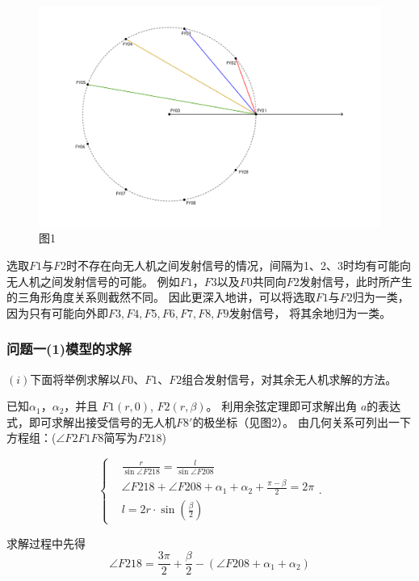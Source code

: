 \documentclass{ctexart}
\def\al{\alpha}
\def\b{\beta}
\begin{document}
	\begin{figure}[htbp]  %
		\centering
		\includegraphics[scale=0.6]{pic/1.png}
		\caption*{图1}
		\label{fig1}
	\end{figure}

	\par
	选取$F1$与$F2$时不存在向无人机之间发射信号的情况，间隔为1、2、3时均有可能向无人机之间发射信号的可能。
	例如$F1$，$F3$以及$F0$共同向$F2$发射信号，此时所产生的三角形角度关系则截然不同。
	因此更深入地讲，可以将选取$F1$与$F2$归为一类，因为只有可能向外即$F3,F4,F5,F6,F7,F8,F9$发射信号，
	将其余地归为一类。
	
	\subsubsection{问题一(1)模型的求解}
	\noindent $(i)$下面将举例求解以$F0$、$F1$、$F2$组合发射信号，对其余无人机求解的方法。
	\par
	已知$\alpha_1$，$\alpha_2$，并且 $F1(r,0)$, $F2(r,\beta)$。
	利用余弦定理即可求解出角 $a$的表达式，即可求解出接受信号的无人机$F8'$的极坐标（见图2）。
	由几何关系可列出一下方程组：($\angle F2F1F8$简写为$F218$)

	\[\left\{
    \begin{aligned}
    &\frac{r}{\sin \angle F2 1 8}=\frac{l}{\sin \angle F208}\\
    &\angle F218+\angle F208 +\al_1 +\al_2 +\frac{\pi -\b}{2} = 2\pi\\
	&l=2r\cdot \sin(\frac{\b}{2})
    \end{aligned}.
    \right.
	\]

	求解过程中先得
	\begin{equation*}
		\angle F218= \frac{3\pi}{2}+\frac{\b}{2}-(\angle F208 +\al_1 +\al_2 )
	\end{equation*}
\end{document}
